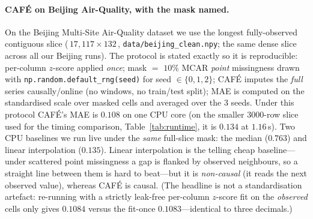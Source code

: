 \documentclass[10pt,twocolumn]{article}
\newcommand{\cafe}{CAF\'E}
\begin{document}
\paragraph{\cafe{} on Beijing Air-Quality, with the mask named.} On the Beijing
Multi-Site Air-Quality dataset we use the longest fully-observed contiguous slice
(\,$17{,}117\times132$\,, \texttt{data/beijing\_clean.npy}; the same dense slice
across all our Beijing runs). The protocol is stated exactly so it is
reproducible: per-column $z$-score applied \emph{once}; mask $=$ $10\%$ MCAR
\emph{point} missingness drawn with \texttt{np.random.default\_rng(seed)} for
seed $\in\{0,1,2\}$; \cafe{} imputes the \emph{full} series causally/online (no
windows, no train/test split); MAE is computed on the standardised scale over
masked cells and averaged over the $3$ seeds. Under this protocol \cafe{}'s MAE is
$\mathbf{0.108}$ on one CPU core (on the smaller $3000$-row slice used for the
timing comparison, Table~\ref{tab:runtime}, it is $0.134$ at $1.16$\,s). Two
CPU baselines we run live under the \emph{same} full-slice mask: the median
($0.763$) and linear interpolation ($0.135$). Linear interpolation is the telling cheap
baseline---under scattered point missingness a gap is flanked by observed
neighbours, so a straight line between them is hard to beat---but it is
\emph{non-causal} (it reads the next observed value), whereas \cafe{} is causal.
(The headline is not a standardisation artefact: re-running with a strictly leak-free
per-column $z$-score fit on the \emph{observed} cells only gives $0.1084$ versus the
fit-once $0.1083$---identical to three decimals.)
\end{document}
